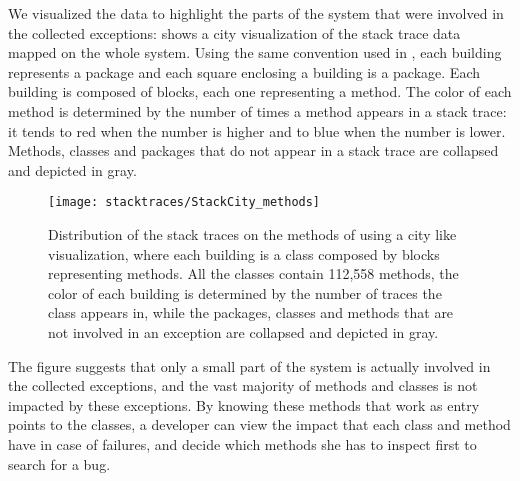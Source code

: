 We visualized the data to highlight the parts of the \pha system that were involved in the collected exceptions:  shows a city visualization of the stack trace data mapped on the whole \pha system.
Using the same convention used in , each building represents a package and each square enclosing a building is a package.
Each building is composed of blocks, each one representing a method.
The color of each method is determined by the number of times a method appears in a stack trace: it tends to red when the number is higher and to blue when the number is lower.
Methods, classes and packages that do not appear in a stack trace are collapsed and depicted in gray.

\begin{figure}[h]
\begin{center}
  \texttt{[image: stacktraces/StackCity\_methods]}
  \caption{Distribution of the stack traces on the methods of \pha using a city like visualization, where each building is a class composed by blocks representing methods.
All the classes contain 112,558 methods, the color of each building is determined by the number of traces the class appears in, while the packages, classes and methods that are not involved in an exception are collapsed and depicted in gray.}
  \label{fig:stackcity-methods}
\end{center}
\end{figure}

The figure suggests that only a small part of the system is actually involved in the collected exceptions, and the vast majority of methods and classes is not impacted by these exceptions.
By knowing these methods that work as entry points to the classes, a developer can view the impact that each class and method have in case of failures, and decide which methods she has to inspect first to search for a bug.

